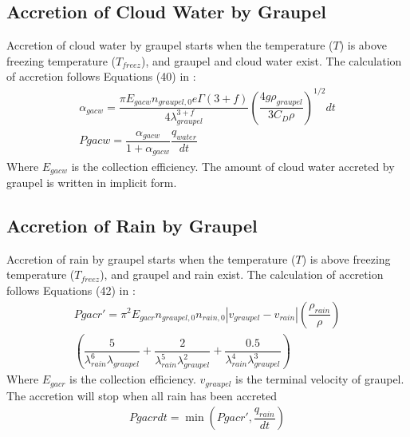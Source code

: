 \documentclass[letterpaper,titlepage,10pt]{article}
\numberwithin{equation}{section}
\begin{document}

\subsection{Accretion of Cloud Water by Graupel}

Accretion of cloud water by graupel starts when the temperature ($T$) is above freezing temperature ($T_{freez}$), and graupel and cloud water exist. The calculation of accretion follows Equations (40) in \citet{lin1983bulk}:
\begin{gather}
	\alpha_{gacw} = \dfrac{\pi E_{gacw} n_{graupel,0} e \Gamma \left(3 + f \right)}{4 \lambda^{3 + f}_{graupel}} \left(\dfrac{4 g \rho_{graupel}}{3 C_D \rho} \right)^{1/2} dt \\
	Pgacw = \dfrac{\alpha_{gacw}}{1 + \alpha_{gacw}} \dfrac{q_{water}}{dt}
\end{gather}
Where $E_{gacw}$ is the collection efficiency. The amount of cloud water accreted by graupel is written in implicit form.


\subsection{Accretion of Rain by Graupel}

Accretion of rain by graupel starts when the temperature ($T$) is above freezing temperature ($T_{freez}$), and graupel and rain exist. The calculation of accretion follows Equations (42) in \citet{lin1983bulk}:
\begin{multline}
	Pgacr' = \pi^2 E_{gacr} n_{graupel,0} n_{rain,0} \left \vert v_{graupel} - v_{rain} \right \vert \left(\dfrac{\rho_{rain}}{\rho} \right) \\
	\left(\dfrac{5}{\lambda^6_{rain} \lambda_{graupel}} + \dfrac{2}{\lambda^5_{rain} \lambda^2_{graupel}} + \dfrac{0.5}{\lambda^4_{rain} \lambda^3_{graupel}} \right)
\end{multline}
Where $E_{gacr}$ is the collection efficiency. $v_{graupel}$ is the terminal velocity of graupel. The accretion will stop when all rain has been accreted
\begin{gather}
	Pgacr dt = \min \left(Pgacr', \dfrac{q_{rain}}{dt} \right)
\end{gather}

\end{document}
